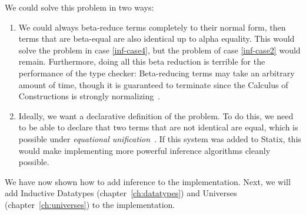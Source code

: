 We could solve this problem in two ways:

\begin{enumerate}
	\item We could always beta-reduce terms completely to their normal form, then terms that are beta-equal are also identical up to alpha equality. This would solve the problem in case \ref{inf-case4}, but the problem of case \ref{inf-case2} would remain. Furthermore, doing all this beta reduction is terrible for the performance of the type checker: Beta-reducing terms may take an arbitrary amount of time, though it is guaranteed to terminate since the Calculus of Constructions is strongly normalizing~\cite{Coquand_Huet_1988}.
	\item Ideally, we want a declarative definition of the problem. To do this, we need to be able to declare that two terms that are not identical are equal, which is possible under \emph{equational unification}~\cite[Section 2.1]{Siekmann86}. If this system was added to Statix, this would make implementing more powerful inference algorithms cleanly possible.
\end{enumerate}

We have now shown how to add inference to the implementation. Next, we will add Inductive Datatypes (chapter~\ref{ch:datatypes}) and Universes (chapter~\ref{ch:universes}) to the implementation.

